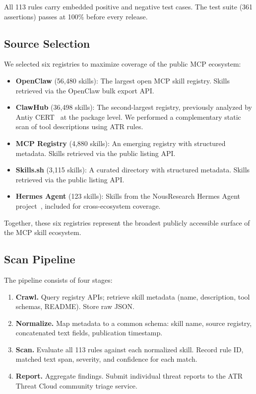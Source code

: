 \documentclass[letterpaper,twocolumn,10pt]{article}
\begin{document}
All 113 rules carry embedded positive and negative test cases.  The test
suite (361 assertions) passes at 100\% before every release.

\subsection{Source Selection}

We selected six registries to maximize coverage of the public MCP
ecosystem:

\begin{itemize}[leftmargin=*,nosep]
  \item \textbf{OpenClaw} (56,480 skills): The largest open MCP skill
    registry.  Skills retrieved via the OpenClaw bulk export API.
  \item \textbf{ClawHub} (36,498 skills): The second-largest registry,
    previously analyzed by Antiy CERT~\cite{antiy2026} at the package
    level.  We performed a complementary static scan of tool
    descriptions using ATR rules.
  \item \textbf{MCP Registry} (4,880 skills): An emerging registry with
    structured metadata.  Skills retrieved via the public listing API.
  \item \textbf{Skills.sh} (3,115 skills): A curated directory with
    structured metadata.  Skills retrieved via the public listing API.
  \item \textbf{Hermes Agent} (123 skills): Skills from the NousResearch
    Hermes Agent project~\cite{hermes}, included for cross-ecosystem
    coverage.
\end{itemize}

Together, these six registries represent the broadest publicly accessible
surface of the MCP skill ecosystem.

\subsection{Scan Pipeline}

The pipeline consists of four stages:

\begin{enumerate}[leftmargin=*,nosep]
  \item \textbf{Crawl.}  Query registry APIs; retrieve skill metadata
    (name, description, tool schemas, README).  Store raw JSON.
  \item \textbf{Normalize.}  Map metadata to a common schema: skill
    name, source registry, concatenated text fields, publication
    timestamp.
  \item \textbf{Scan.}  Evaluate all 113 rules against each normalized
    skill.  Record rule ID, matched text span, severity, and confidence
    for each match.
  \item \textbf{Report.}  Aggregate findings.  Submit individual threat
    reports to the ATR Threat Cloud community triage service.
\end{enumerate}
\end{document}
